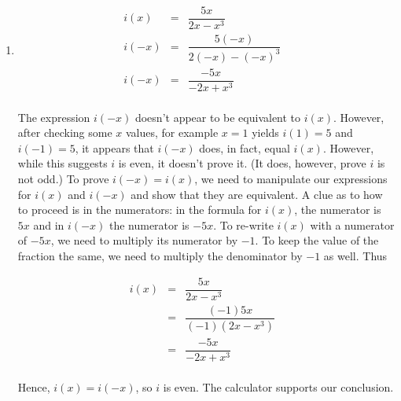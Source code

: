 \begin{ex}
\begin{enumerate}
\item  \[ \begin{array}{rclr}   

i(x) & = & \dfrac{5x}{2x - x^3} & \\ 
i(-x) & = & \dfrac{5(-x)}{2(-x) - (-x)^3} & \\ 
i(-x) & = & \dfrac{-5x}{-2x + x^3} & \\  

\end{array} \]

\setlength{\extrarowheight}{2pt}

The expression  $i(-x)$ doesn't appear to be equivalent to $i(x)$.  However, after checking some $x$ values, for example $x=1$ yields $i(1) = 5$ and $i(-1 )= 5$, it appears that $i(-x)$ does, in fact, equal $i(x)$.  However, while this suggests  $i$ is even, it doesn't prove it.  (It does, however, prove $i$ is not odd.)  To prove $i(-x) = i(x)$, we need to manipulate our expressions for $i(x)$ and $i(-x)$ and show that they are equivalent.  A clue as to how to proceed is in the numerators: in the formula for $i(x)$, the numerator is $5x$ and in $i(-x)$ the numerator is $-5x$.  To re-write $i(x)$ with a numerator of $-5x$, we need to multiply its numerator by $-1$.  To keep the value of the fraction the same, we need to multiply the denominator by $-1$ as well.  Thus

\setlength{\extrarowheight}{8pt}

 \[ \begin{array}{rclr}   

i(x) & = & \dfrac{5x}{2x - x^3} & \\ 
& = & \dfrac{(-1) 5x}{(-1)\left(2x - x^3\right)} & \\ 
& = & \dfrac{-5x}{-2x + x^3} & \\  

\end{array} \]

\setlength{\extrarowheight}{2pt}

Hence, $i(x) = i(-x)$, so $i$ is even.  The calculator supports our conclusion.

\begin{center}

\begin{tabular}{cc}


\end{tabular}
\end{center}
\end{enumerate}
\end{ex}
